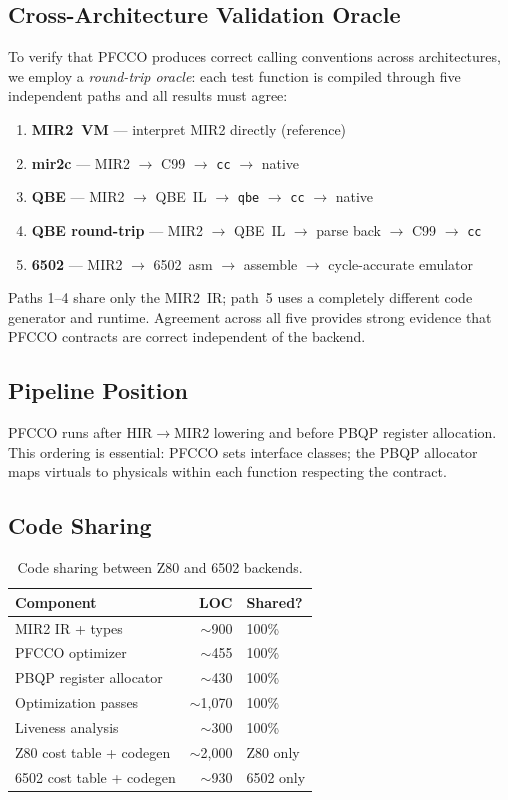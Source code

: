 \documentclass[sigplan,screen,nonacm]{acmart}
\begin{document}
\subsection{Cross-Architecture Validation Oracle}
\label{sec:impl:oracle}

To verify that PFCCO produces correct calling conventions across
architectures, we employ a \emph{round-trip oracle}: each test function is
compiled through five independent paths and all results must agree:

\begin{enumerate}
\item \textbf{MIR2~VM} --- interpret MIR2 directly (reference)
\item \textbf{mir2c} --- MIR2 $\to$ C99 $\to$ \texttt{cc} $\to$ native
\item \textbf{QBE} --- MIR2 $\to$ QBE~IL $\to$ \texttt{qbe} $\to$
  \texttt{cc} $\to$ native
\item \textbf{QBE round-trip} --- MIR2 $\to$ QBE~IL $\to$ parse back $\to$
  C99 $\to$ \texttt{cc}
\item \textbf{6502} --- MIR2 $\to$ 6502~asm $\to$ assemble $\to$
  cycle-accurate emulator
\end{enumerate}

\noindent Paths 1--4 share only the MIR2~IR; path~5 uses a completely
different code generator and runtime.  Agreement across all five provides
strong evidence that PFCCO contracts are correct independent of the backend.

\subsection{Pipeline Position}

PFCCO runs after HIR$\to$MIR2 lowering and before PBQP register allocation.
This ordering is essential: PFCCO sets interface classes; the PBQP allocator
maps virtuals to physicals within each function respecting the contract.

\subsection{Code Sharing}

\begin{table}[h]
\centering\small
\caption{Code sharing between Z80 and 6502 backends.}
\label{tab:sharing}
\begin{tabular}{@{}lrl@{}}
\toprule
Component & LOC & Shared? \\
\midrule
MIR2 IR + types         & $\sim$900  & 100\% \\
PFCCO optimizer         & $\sim$455  & 100\% \\
PBQP register allocator & $\sim$430  & 100\% \\
Optimization passes     & $\sim$1{,}070 & 100\% \\
Liveness analysis       & $\sim$300  & 100\% \\
\midrule
Z80 cost table + codegen  & $\sim$2{,}000 & Z80 only \\
6502 cost table + codegen & $\sim$930  & 6502 only \\
\bottomrule
\end{tabular}
\end{table}
\end{document}
